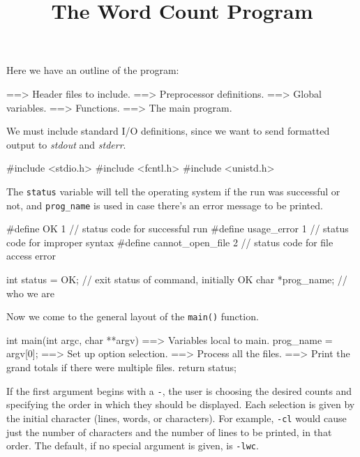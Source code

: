 \documentclass[11pt,a4paper]{article}
\title{The Word Count Program}
\begin{document}
\maketitle

Here we have an outline of the program:

\begin{code}[language=c]
==> Header files to include.
==> Preprocessor definitions.
==> Global variables.
==> Functions.
==> The main program.
\end{code}

We must include standard I/O definitions, since we want to send formatted output to \emph{stdout}
and \emph{stderr}.

\begin{code}[name=Header files to include]
#include <stdio.h>
#include <fcntl.h>
#include <unistd.h>
\end{code}

The \texttt{status} variable will tell the operating system if the run was successful or not, and
\texttt{prog\_name} is used in case there's an error message to be printed.

\begin{code}[name=Preprocessor definitions]
#define OK 1                // status code for successful run
#define usage_error 1       // status code for improper syntax
#define cannot_open_file 2  // status code for file access error
\end{code}

\begin{code}[name={Global variables}]
int status = OK;  // exit status of command, initially OK
char *prog_name;  // who we are
\end{code}

Now we come to the general layout of the \texttt{main()} function.

\begin{code}[language=c,name=The main program]
int main(int argc, char **argv)
{
    ==> Variables local to main.
    prog_name = argv[0];
    ==> Set up option selection.
    ==> Process all the files.
    ==> Print the grand totals if there were multiple files.
    return status;
}
\end{code}

If the first argument begins with a \texttt{-}, the user is choosing the desired counts and
specifying the order in which they should be displayed. Each selection is given by the initial
character  (lines, words, or characters). For example, \texttt{-cl} would cause just the number of
characters and the number of lines to be printed, in that order. The default, if no special argument
is given, is \texttt{-lwc}.
\end{document}
